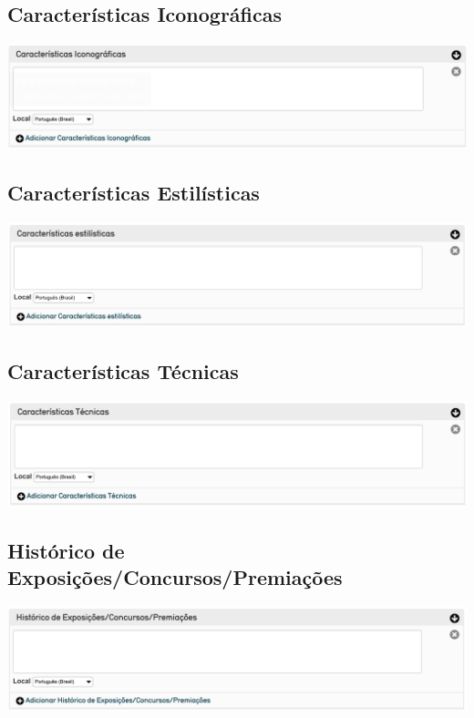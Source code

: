 \subsection{Características Iconográficas}
\begin{flushleft}
	\includegraphics[width=\linewidth]{elemento-19}
\end{flushleft}

\subsection{Características Estilísticas}
\begin{flushleft}
	\includegraphics[width=\linewidth]{elemento-20}
\end{flushleft}

\subsection{Características Técnicas}
\begin{flushleft}
	\includegraphics[width=\linewidth]{elemento-21}
\end{flushleft}

\subsection{Histórico de Exposições/Concursos/Premiações}
\begin{flushleft}
	\includegraphics[width=\linewidth]{elemento-22}
\end{flushleft}

